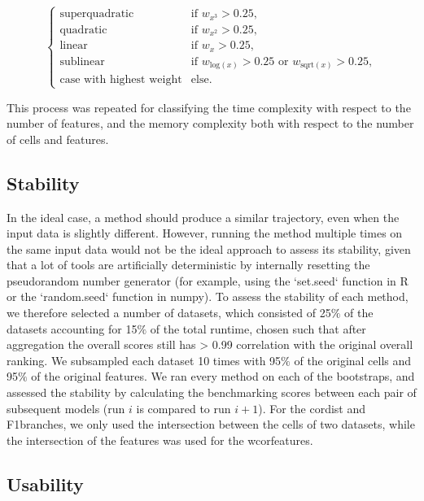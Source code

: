 $$
\begin{cases}
\text{superquadratic} & \text{if } w_{x^3} > 0.25,\\
\text{quadratic} & \text{if } w_{x^2} > 0.25,\\
\text{linear} & \text{if } w_x > 0.25,\\
\text{sublinear} & \text{if } w_{\text{log}(x)} > 0.25 \text{ or } w_{\text{sqrt}(x)} > 0.25,\\
\text{case with highest weight} & \text{else.}
\end{cases}
$$

This process was repeated for classifying the time complexity with respect to the number of features, and the memory complexity both with respect to the number of cells and features.

\subsection{Stability}

In the ideal case, a method should produce a similar trajectory, even when the input data is slightly different. However, running the method multiple times on the same input data would not be the ideal approach to assess its stability, given that a lot of tools are artificially deterministic by internally resetting the pseudorandom number generator (for example, using the `set.seed` function in R or the `random.seed` function in numpy). To assess the stability of each method, we therefore selected a number of datasets, which consisted of 25$\%$ of the datasets accounting for 15$\%$ of the total runtime, chosen such that after aggregation the overall scores still has > 0.99 correlation with the original overall ranking. We subsampled each dataset 10 times with 95$\%$ of the original cells and 95$\%$ of the original features. We ran every method on each of the bootstraps, and assessed the stability by calculating the benchmarking scores between each pair of subsequent models (run $i$ is compared to run $i+1$). For the cordist and F1branches, we only used the intersection between the cells of two datasets, while the intersection of the features was used for the wcorfeatures.

\subsection{Usability}

